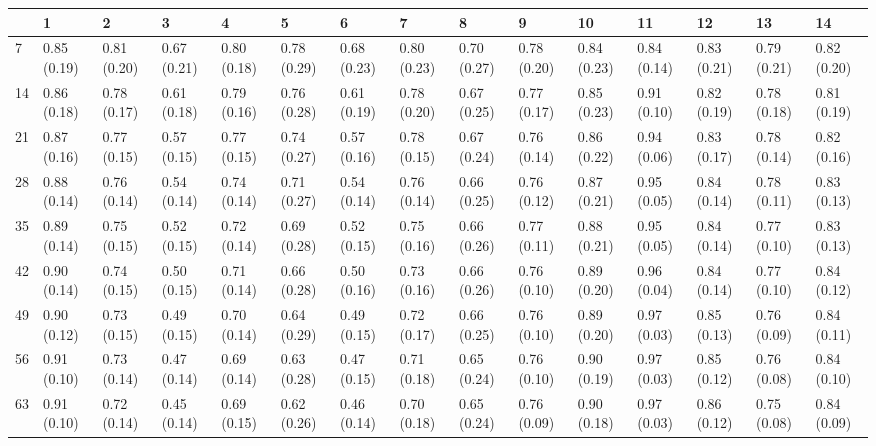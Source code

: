 \begin{tabular}{lllllllllllllll}
\toprule
{} &            1 &            2 &            3 &            4 &            5 &            6 &            7 &            8 &            9 &           10 &           11 &           12 &           13 &           14 \\
\midrule
7   &  0.85 (0.19) &  0.81 (0.20) &  0.67 (0.21) &  0.80 (0.18) &  0.78 (0.29) &  0.68 (0.23) &  0.80 (0.23) &  0.70 (0.27) &  0.78 (0.20) &  0.84 (0.23) &  0.84 (0.14) &  0.83 (0.21) &  0.79 (0.21) &  0.82 (0.20) \\
14  &  0.86 (0.18) &  0.78 (0.17) &  0.61 (0.18) &  0.79 (0.16) &  0.76 (0.28) &  0.61 (0.19) &  0.78 (0.20) &  0.67 (0.25) &  0.77 (0.17) &  0.85 (0.23) &  0.91 (0.10) &  0.82 (0.19) &  0.78 (0.18) &  0.81 (0.19) \\
21  &  0.87 (0.16) &  0.77 (0.15) &  0.57 (0.15) &  0.77 (0.15) &  0.74 (0.27) &  0.57 (0.16) &  0.78 (0.15) &  0.67 (0.24) &  0.76 (0.14) &  0.86 (0.22) &  0.94 (0.06) &  0.83 (0.17) &  0.78 (0.14) &  0.82 (0.16) \\
28  &  0.88 (0.14) &  0.76 (0.14) &  0.54 (0.14) &  0.74 (0.14) &  0.71 (0.27) &  0.54 (0.14) &  0.76 (0.14) &  0.66 (0.25) &  0.76 (0.12) &  0.87 (0.21) &  0.95 (0.05) &  0.84 (0.14) &  0.78 (0.11) &  0.83 (0.13) \\
35  &  0.89 (0.14) &  0.75 (0.15) &  0.52 (0.15) &  0.72 (0.14) &  0.69 (0.28) &  0.52 (0.15) &  0.75 (0.16) &  0.66 (0.26) &  0.77 (0.11) &  0.88 (0.21) &  0.95 (0.05) &  0.84 (0.14) &  0.77 (0.10) &  0.83 (0.13) \\
42  &  0.90 (0.14) &  0.74 (0.15) &  0.50 (0.15) &  0.71 (0.14) &  0.66 (0.28) &  0.50 (0.16) &  0.73 (0.16) &  0.66 (0.26) &  0.76 (0.10) &  0.89 (0.20) &  0.96 (0.04) &  0.84 (0.14) &  0.77 (0.10) &  0.84 (0.12) \\
49  &  0.90 (0.12) &  0.73 (0.15) &  0.49 (0.15) &  0.70 (0.14) &  0.64 (0.29) &  0.49 (0.15) &  0.72 (0.17) &  0.66 (0.25) &  0.76 (0.10) &  0.89 (0.20) &  0.97 (0.03) &  0.85 (0.13) &  0.76 (0.09) &  0.84 (0.11) \\
56  &  0.91 (0.10) &  0.73 (0.14) &  0.47 (0.14) &  0.69 (0.14) &  0.63 (0.28) &  0.47 (0.15) &  0.71 (0.18) &  0.65 (0.24) &  0.76 (0.10) &  0.90 (0.19) &  0.97 (0.03) &  0.85 (0.12) &  0.76 (0.08) &  0.84 (0.10) \\
63  &  0.91 (0.10) &  0.72 (0.14) &  0.45 (0.14) &  0.69 (0.15) &  0.62 (0.26) &  0.46 (0.14) &  0.70 (0.18) &  0.65 (0.24) &  0.76 (0.09) &  0.90 (0.18) &  0.97 (0.03) &  0.86 (0.12) &  0.75 (0.08) &  0.84 (0.09) \\

\end{tabular}
